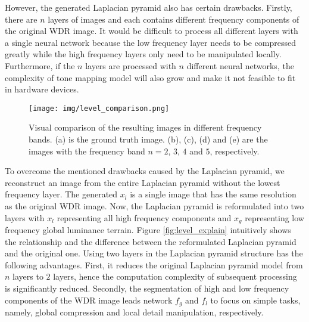 \documentclass[journal]{IEEEtran}
\begin{document}
However, the generated Laplacian pyramid also has certain drawbacks. Firstly, there are $n$ layers of images and each contains different frequency components of the original WDR image. It would be difficult to process all different layers with a single neural network because the low frequency layer needs to be compressed greatly while the high frequency layers only need to be manipulated locally.  Furthermore, if the $n$ layers are processed with $n$ different neural networks, the complexity of tone mapping model will also grow and make it not feasible to fit in hardware devices. 

\begin{figure*}[t]
\begin{center}
   \texttt{[image: img/level\_comparison.png]}
\end{center}	
   \caption{Visual comparison of the resulting images in different frequency bands. (a) is the ground truth image. (b), (c), (d) and (e) are the images with the frequency band $n=2$, $3$, $4$ and $5$, respectively.}
\label{fig:level_conparison}
\end{figure*}

To overcome the mentioned drawbacks caused by the Laplacian pyramid, we reconstruct an image from the entire Laplacian pyramid without the lowest frequency layer. The generated $x_l$ is a single image that has the same resolution as the original WDR image. Now, the Laplacian pyramid is reformulated into two layers with $x_l$ representing all high frequency components and $x_g$ representing low frequency global luminance terrain.  Figure \ref{fig:level_explain} intuitively shows the relationship and the difference between the reformulated Laplacian pyramid and the original one.  Using two layers in the Laplacian pyramid structure has the following advantages. First, it reduces the original Laplacian pyramid model from $n$ layers to $2$ layers, hence the computation complexity of subsequent processing is significantly reduced. Secondly, the segmentation of high and low frequency components of the WDR image leads network $f_g$ and $f_l$ to focus on simple tasks, namely, global compression and local detail manipulation, respectively.

\end{document}

